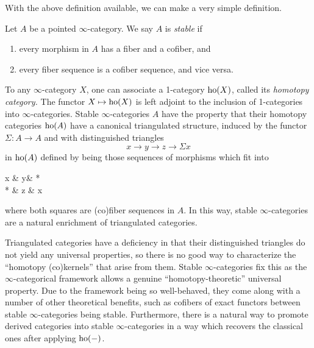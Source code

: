 With the above definition available, we can make a very simple definition.
\begin{definition}
	Let \(A\) be a pointed \(\infty\)-category. We say \(A\) is \emph{stable} if
	\begin{enumerate}[label=(\arabic*)]
	\item every morphism in \(A\) has a fiber and a cofiber, and
	\item every fiber sequence is a cofiber sequence, and vice versa.
	\end{enumerate}
\end{definition}

To any \(\infty\)-category \(X\), one can associate a 1-category \(\operatorname{ho}(X)\), called its \emph{homotopy category.} The functor \(X\mapsto\operatorname{ho}(X)\) is left adjoint to the inclusion of 1-categories
into \(\infty\)-categories. Stable \(\infty\)-categories \(A\) have the property that their homotopy categories \(\operatorname{ho}(A)\) have a canonical triangulated structure, induced by the functor
\(\Sigma\!:A\to A\) and with distinguished triangles
\[ x\to y\to z \to \Sigma x \]
in \(\operatorname{ho}(A)\) defined by being those sequences of morphisms which fit into
\begin{diagram*}
	x \ar[r]\ar[d] & y\ar[d]\ar[r] & *\ar[d] \\
	* \ar[r] & z \ar[r] & \Sigma x
\end{diagram*}
where both squares are (co)fiber sequences in \(A\). In this way, stable \(\infty\)-categories are a natural enrichment of triangulated categories.

Triangulated categories have a deficiency in that their distinguished triangles do not yield any universal properties, so there is no good way to characterize the ``homotopy (co)kernels''
that arise from them. Stable \(\infty\)-categories fix this as the \(\infty\)-categorical framework allows a genuine ``homotopy-theoretic'' universal property. Due to the framework
being so well-behaved, they come along with a number of other theoretical benefits, such as cofibers of exact functors between stable \(\infty\)-categories being stable. Furthermore,
there is a natural way to promote derived categories into stable \(\infty\)-categories in a way which recovers the classical ones after applying \(\operatorname{ho}(-)\).

